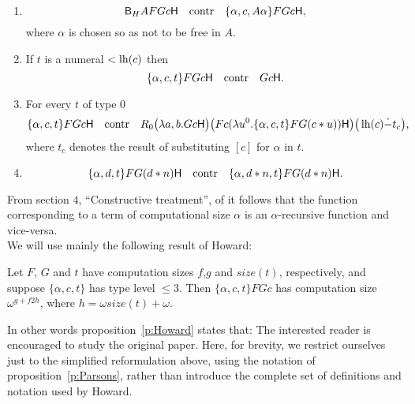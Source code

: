 \begin{enumerate}
\item
\[ \textsf{\upshape B}_H AFGc\textsf{\upshape H}\quad \text{contr}\quad \{\alpha, c, A\alpha\}FGc\textsf{\upshape H}  
\text{,}
\]
where $\alpha$ is chosen so as not to be free in $A$.
\item If $t$ is a numeral $<\operatorname{lh}(c)$ then
\[
 \{\alpha, c, t\}FGc\textsf{\upshape H}\quad \text{contr}\quad  Gc\textsf{\upshape H} \text{.}
\]
\item For every $t$ of type $0$
\[
 \{\alpha, c, t\}FGc\textsf{\upshape H}\quad \text{contr}\quad  
         R_0  \big(\lambda a,b.Gc\textsf{\upshape H}\big)  \big(Fc( \lambda u^0.\{\alpha, c, t\}FG(c*u) )\textsf{\upshape H}\big)   \big( \operatorname{lh}(c) \dot- t_c\big)
\text{,}
\]
where $t_c$ denotes the result of substituting $[c]$ for $\alpha$ in $t$.
\item
\[
 \{\alpha, d, t\}FG(d*n)\textsf{\upshape H}\quad \text{contr}\quad \{\alpha, d*n, t\}FG(d*n)\textsf{\upshape H} \text{.}
\]
\end{enumerate}

From section $4$, ``Constructive treatment'', of \cite{Howard81} it follows that 
the function corresponding to a term of computational size $\alpha$ is an $\alpha$-recursive 
function and vice-versa.\\
We will use mainly the following result of Howard:
\begin{prop}\label{p:Howard}
Let $F$, $G$ and $t$ have computation sizes $f$,$g$ and $size(t)$, respectively,
and suppose $\{\alpha, c, t\}$ has type level $\leq 3$. Then $\{\alpha, c, t\}FGc$
has computation size $\omega^{g+f2h}$, where $h=\omega size(t)+\omega$.
\end{prop}

In other words proposition~\ref{p:Howard} states that: 
The interested reader is encouraged to study the original paper. Here, for brevity,
we restrict ourselves just to the simplified reformulation above, using the notation of 
proposition~\ref{p:Parsons}, rather than introduce the complete set
of definitions and notation used by Howard.


